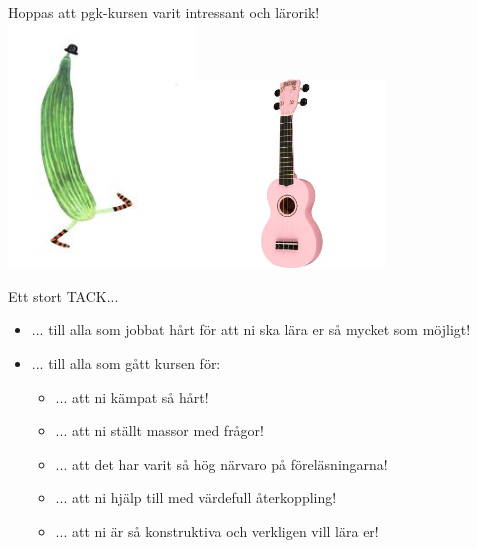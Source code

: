 
\begin{Slide}{Hoppas att pgk-kursen varit intressant och lärorik!}
\pause\includegraphics[width=5cm]{../img/gurka.jpg}\includegraphics[width=5cm]{../img/ukulele.jpg}
\end{Slide}

\begin{Slide}{Ett stort TACK...}
\begin{itemize}
  \item
... till alla  som jobbat hårt för att ni ska lära er så mycket som möjligt!
\item ... till alla  som gått kursen för:
\begin{itemize}
\item ... att ni kämpat så hårt!
\item ... att ni ställt massor med frågor!
\item ... att det har varit så hög närvaro på föreläsningarna!
\item ... att ni hjälp till med värdefull återkoppling!
\item ... att ni är så konstruktiva och verkligen vill lära er!
\end{itemize}
\vspace{2em} \pause

\end{itemize}
\end{Slide}



\fi
